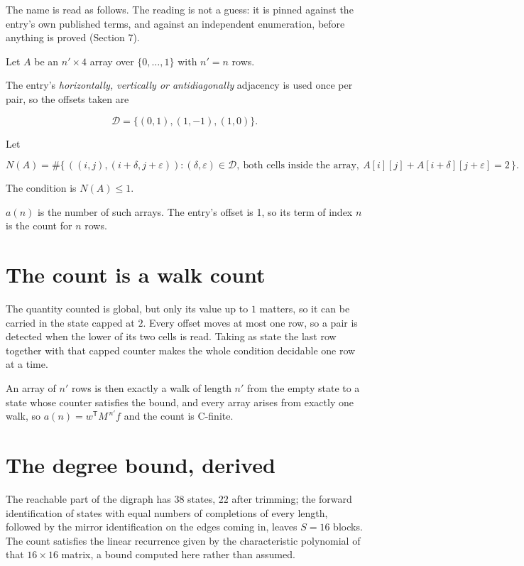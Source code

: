 \documentclass[11pt]{article}
\theoremstyle{definition}
\begin{document}
The name is read as follows. The reading is not a guess: it is pinned against the entry's own published terms, and against an independent enumeration, before anything is proved (Section 7).

Let $A$ be an $n' \times 4$ array over $\{0,\dots,1\}$ with $n' = n$ rows.

The entry's {\itshape horizontally, vertically or antidiagonally} adjacency is used once per pair, so the offsets taken are

\[\mathcal{D} = \{(0,1), (1,-1), (1,0)\}.\]

Let

\[N(A) = \#\bigl\{\,((i,j),(i{+}\delta,j{+}\varepsilon)) : (\delta,\varepsilon) \in \mathcal{D},\ \text{both cells inside the array},\ A[i][j] + A[i{+}\delta][j{+}\varepsilon] = 2\,\bigr\}.\]

The condition is $N(A) \le 1$.

$a(n)$ is the number of such arrays. The entry's offset is 1, so its term of index $n$ is the count for $n$ rows.

\section{The count is a walk count}

The quantity counted is global, but only its value up to $1$ matters, so it can be carried in the state capped at $2$. Every offset moves at most one row, so a pair is detected when the lower of its two cells is read. Taking as state the last row together with that capped counter makes the whole condition decidable one row at a time.

An array of $n'$ rows is then exactly a walk of length $n'$ from the empty state to a state whose counter satisfies the bound, and every array arises from exactly one walk, so $a(n) = w^{\mathsf T}M^{\,n'}f$ and the count is C-finite.

\section{The degree bound, derived}

The reachable part of the digraph has $38$ states, $22$ after trimming; the forward identification of states with equal numbers of completions of every length, followed by the mirror identification on the edges coming in, leaves $S = 16$ blocks. The count satisfies the linear recurrence given by the characteristic polynomial of that $16\times16$ matrix, a bound computed here rather than assumed.
\end{document}
